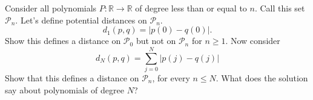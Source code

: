   \begin{exercise}
    Consider all polynomials $P : \mathbb{R} \to \mathbb{R}$ of degree less than or equal to $n$. Call this set $\mathcal{P}_n$. Let's define potential distances on $\mathcal{P}_n$.
    \begin{equation}
      d_1(p,q) = |p(0) - q(0)|.
    \end{equation}
    Show this defines a distance on $\mathcal{P}_0$ but not on $\mathcal{P}_n$ for $n \geq 1$. Now consider
    \begin{equation}
      d_N(p,q) = \sum_{j=0}^N |p(j) - q(j)|
    \end{equation}
    Show that this defines a distance on $\mathcal{P}_n$, for every $n \leq N$. What does the solution say about polynomials of degree $N$?
  \end{exercise}
